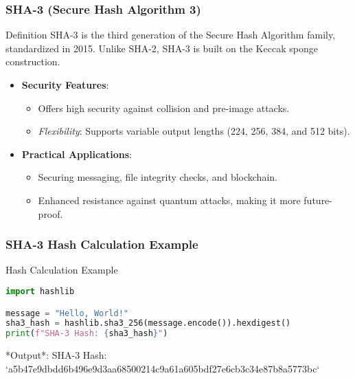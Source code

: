 \documentclass{beamer}
\begin{document}
\begin{frame}[fragile]
    \frametitle{SHA-3 (Secure Hash Algorithm 3)}
    \begin{block}{Definition}
        SHA-3 is the third generation of the Secure Hash Algorithm family, standardized in 2015. 
        Unlike SHA-2, SHA-3 is built on the Keccak sponge construction.
    \end{block}

    \begin{itemize}
        \item \textbf{Security Features}:
            \begin{itemize}
                \item Offers high security against collision and pre-image attacks.
                \item \textit{Flexibility}: Supports variable output lengths (224, 256, 384, and 512 bits).
            \end{itemize}

        \item \textbf{Practical Applications}:
            \begin{itemize}
                \item Securing messaging, file integrity checks, and blockchain.
                \item Enhanced resistance against quantum attacks, making it more future-proof.
            \end{itemize}
    \end{itemize}

\end{frame}

\begin{frame}[fragile]
    \frametitle{SHA-3 Hash Calculation Example}
    \begin{block}{Hash Calculation Example}
        \begin{lstlisting}[language=Python]
import hashlib

message = "Hello, World!"
sha3_hash = hashlib.sha3_256(message.encode()).hexdigest()
print(f"SHA-3 Hash: {sha3_hash}")
        \end{lstlisting}
        *Output*: SHA-3 Hash: `a5b47e9dbdd6b496e9d3aa68500214c9a61a605bdf27e6cb3c34e87b8a5773bc`
    \end{block}
\end{frame}
\end{document}
